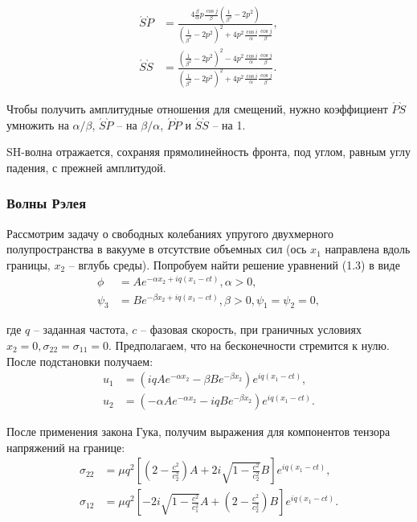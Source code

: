\begin{align}
\acute{S}\grave{P} &= \frac{ 4\frac{\beta}{\alpha}p\frac{\cos{j}}{\beta}(\frac{1}{\beta^2} - 2p^2) }{ (\frac{1}{\beta^2} - 2p^2)^2 + 4p^2\frac{\cos{i}}{\alpha}\frac{\cos{j}}{\beta} }, \nonumber\\
\acute{S}\grave{S} &= \frac{ (\frac{1}{\beta^2} - 2p^2)^2 - 4p^2\frac{\cos{i}}{\alpha}\frac{\cos{j}}{\beta} }{ (\frac{1}{\beta^2} - 2p^2)^2 + 4p^2\frac{\cos{i}}{\alpha}\frac{\cos{j}}{\beta} }.
\end{align}

Чтобы получить амплитудные отношения для смещений, нужно коэффициент $\acute{P}\grave{S}$ умножить на $\alpha/\beta$, $\acute{S}\grave{P}$ -- на $\beta/\alpha$, $\acute{P}\grave{P}$ и $\acute{S}\grave{S}$ -- на 1.

SH-волна отражается, сохраняя прямолинейность фронта, под углом, равным углу падения, с прежней амплитудой.


\subsubsection{Волны Рэлея}

Рассмотрим задачу о свободных колебаниях упругого двухмерного полупространства в вакууме в отсутствие объемных сил (ось $x_1$ направлена вдоль границы, $x_2$ -- вглубь среды). Попробуем найти решение уравнений (1.3) в виде
\begin{align}
\phi &= Ae^{-\alpha x_2 + iq(x_1-ct)}, \alpha > 0, \nonumber\\
\psi_3 &= Be^{-\beta x_2 + iq(x_1-ct)}, \beta > 0, \psi_1 = \psi_2 = 0,
\end{align}

где $q$ -- заданная частота, $c$ -- фазовая скорость, при граничных условиях $x_2 = 0, \sigma_{22} = \sigma_{11} = 0$. Предполагаем, что на бесконечности стремится к нулю. После подстановки получаем:
\begin{align}
u_1 &= (iq Ae^{-\alpha x_2} - \beta Be^{-\beta x_2}) e^{iq(x_1-ct)}, \nonumber\\
u_2 &= (-\alpha Ae^{-\alpha x_2} - iq Be^{-\beta x_2}) e^{iq(x_1-ct)}.
\end{align}

После применения закона Гука, получим выражения для компонентов тензора напряжений на границе:
\begin{align}
\sigma_{22} &= \mu q^2 [ (2-\frac{c^2}{c_2^2})A + 2i\sqrt{1-\frac{c^2}{c_2^2}}B ] e^{iq(x_1-ct)}, \nonumber\\
\sigma_{12} &= \mu q^2 [ -2i\sqrt{1-\frac{c^2}{c_1^2}}A + (2-\frac{c^2}{c_2^2})B ] e^{iq(x_1-ct)}.
\end{align}

